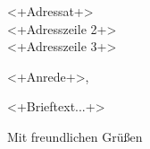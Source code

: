 \documentclass[Briefformat]{scrlttr2}
\begin{document}

\begin{letter}{<+Adressat+>\\ <+Adresszeile 2+>\\ <+Adresszeile 3+>}

\opening{<+Anrede+>,}

<+Brieftext...+>

\closing{Mit freundlichen Grüßen}

\end{letter}
\end{document}
